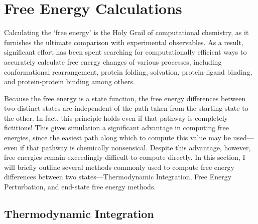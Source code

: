 \section{Free Energy Calculations}

Calculating the `free energy' is the Holy Grail of computational chemistry, as
it furnishes the ultimate comparison with experimental observables. As a result,
significant effort has been spent searching for computationally efficient ways
to accurately calculate free energy changes of various processes, including
conformational rearrangement, \cite{Vorobjev1998, Head1997} protein folding,
\cite{Yang1995a, Yang1995b, Portman_PhysRevLett_1998_v81_p5237} solvation,
\cite{Eisenberg1986, Jean-Charles1991} protein-ligand binding,
\cite{Massova1999, Woo2005} and protein-protein binding \cite{Gohlke2003,
Gohlke2004} among others.

Because the free energy is a state function, the free energy differences between
two distinct states are independent of the path taken from the starting state to
the other. In fact, this principle holds even if that pathway is completely
fictitious! This gives simulation a significant advantage in computing free
energies, since the easiest path along which to compute this value may be
used---even if that pathway is chemically nonsensical. Despite this advantage,
however, free energies remain exceedingly difficult to compute directly.
\cite{Meirovitch_CurrOpinStructBiol_2007_v17_p181} In this section, I will
briefly outline several methods commonly used to compute free energy differences
between two states---Thermodynamic Integration, Free Energy Perturbation, and
end-state free energy methods.

\subsection{Thermodynamic Integration}
\label{sec2:ThermodynamicIntegration}

